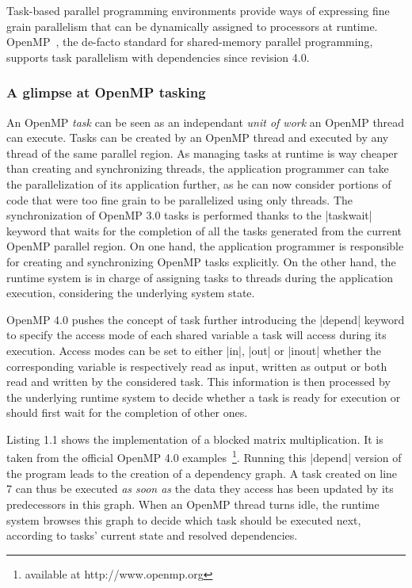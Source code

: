 \documentclass{Styles/llncs}
\begin{document}
Task-based parallel programming environments provide ways of expressing fine grain parallelism that can be dynamically assigned to processors at runtime.
OpenMP~\cite{openmp40}, the de-facto standard for shared-memory parallel programming, supports task parallelism with dependencies since revision 4.0.

\subsubsection{A glimpse at OpenMP tasking}

An OpenMP \emph{task} can be seen as an independant \emph{unit of work} an OpenMP thread can execute.
Tasks can be created by an OpenMP thread and executed by any thread of the same parallel region. 
As managing tasks at runtime is way cheaper than creating and synchronizing threads, the application programmer can take the parallelization of its application further, as he can now consider portions of code that were too fine grain to be parallelized using only threads.
The synchronization of OpenMP 3.0 tasks is performed thanks to the |taskwait| keyword that waits for the completion of all the tasks generated from the current OpenMP parallel region.
On one hand, the application programmer is responsible for creating and synchronizing OpenMP tasks explicitly. 
On the other hand, the runtime system is in charge of assigning tasks to threads during the application execution, considering the underlying system state.

OpenMP 4.0 pushes the concept of task further introducing the |depend| keyword to specify the access mode of each shared variable a task will access during its execution. 
Access modes can be set to either |in|, |out| or |inout| whether the corresponding variable is respectively read as input, written as output or both read and written by the considered task. 
This information is then processed by the underlying runtime system to decide whether a task is ready for execution or should first wait for the completion of other ones.

Listing 1.1 shows the implementation of a blocked matrix multiplication. It is
taken from the official OpenMP 4.0 examples~\footnote{available at http://www.openmp.org}.
Running this |depend| version of the program leads to the creation of a dependency graph.
A task created on line 7 can thus be executed \emph{as soon as} the data they access has been updated by its predecessors in this graph.
When an OpenMP thread turns idle, the runtime system browses this graph to decide which task should be executed next, according to tasks' current state and resolved dependencies.
\end{document}
